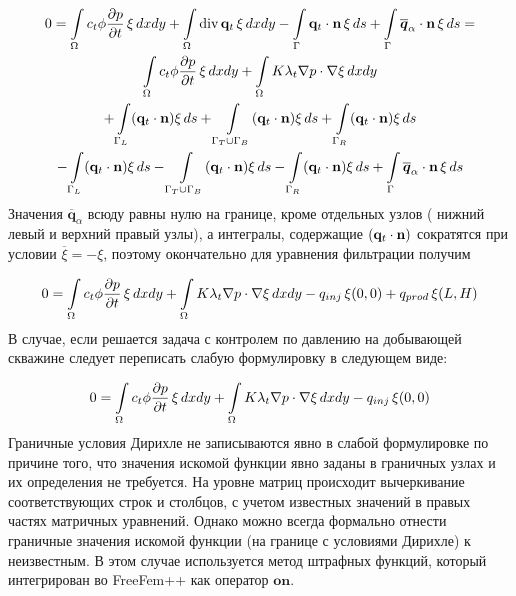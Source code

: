 \begin{multline}
	\displaystyle 0=\int\limits_\Omega c_t\phi \dfrac{\partial p}{\partial t}\, \xi \,dx dy 
	 + \int\limits_\Omega \operatorname{div}{\mathbf{q}_t}\, \xi \,dx dy
	 - \int\limits_{\Gamma} \mathbf{q}_t\cdot \mathbf{n} \, \xi \,ds 
	 + \int\limits_{\Gamma} \overline{\bm{q}}_{\alpha}\cdot \mathbf{n} \, \xi \,ds = \\ 
	 \int\limits_\Omega c_t\phi \dfrac{\partial p}{\partial t}\, \xi \,dx dy 
	 + \int\limits_\Omega K \lambda_t \nabla p \cdot \nabla\xi \,dx dy \\
	 +\int\limits_{\Gamma_L} (\mathbf{q}_t \cdot \mathbf{n}) \xi \, ds
	 +\int\limits_{\Gamma_T\cup \Gamma_B} (\mathbf{q}_t \cdot \mathbf{n}) \xi \, ds
	 +\int\limits_{\Gamma_R} (\mathbf{q}_t \cdot \mathbf{n}) \xi \, ds \\
	 -\int\limits_{\Gamma_L} (\mathbf{q}_t \cdot \mathbf{n}) \xi \, ds
	 -\int\limits_{\Gamma_T\cup \Gamma_B} (\mathbf{q}_t \cdot \mathbf{n}) \xi \, ds
	 -\int\limits_{\Gamma_R} (\mathbf{q}_t \cdot \mathbf{n}) \xi \, ds 
	 +\int\limits_{\Gamma} \overline{\bm{q}}_{\alpha}\cdot \mathbf{n} \, \xi \, ds\\ 
\end{multline}
Значения $\overline{\bm{q}}_{\alpha}$ всюду равны нулю на границе, кроме отдельных узлов (
нижний левый и верхний правый узлы), а интегралы, содержащие $(\mathbf{q}_t \cdot \mathbf{n})$ сократятся
при условии $\overline{\xi} = -\xi$, поэтому окончательно для уравнения фильтрации получим

\begin{equation}
	0=\int\limits_\Omega c_t\phi \dfrac{\partial p}{\partial t}\, \xi \,dx dy 
	+ \int\limits_\Omega K \lambda_t \nabla p \cdot \nabla\xi \,dx dy - q_{inj}\, \xi(0,0)
	+ q_{prod}\, \xi(L,H)
\end{equation}
В случае, если решается задача с контролем по давлению на добывающей скважине следует переписать
слабую формулировку в следующем виде:

\begin{equation}
	0=\int\limits_\Omega c_t\phi \dfrac{\partial p}{\partial t}\, \xi \,dx dy 
	+ \int\limits_\Omega K \lambda_t \nabla p \cdot \nabla\xi \,dx dy - q_{inj}\, \xi(0,0)
\end{equation}
Граничные условия Дирихле не записываются явно в слабой формулировке по причине того, что
значения искомой функции явно заданы в граничных узлах и их определения не требуется. На уровне матриц
происходит вычеркивание соответствующих строк и столбцов, с учетом известных значений в правых
частях матричных уравнений. Однако можно всегда формально отнести граничные значения искомой функции (на границе 
с условиями Дирихле) к неизвестным. В этом случае используется метод штрафных функций, который
интегрирован во FreeFem++ как оператор $\mathbf{on}$. 

